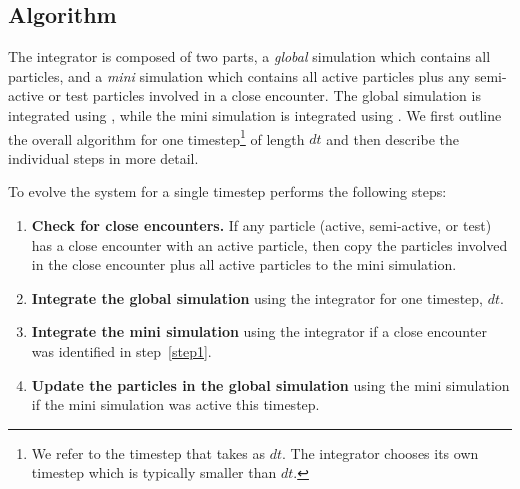 
\subsection{Algorithm}
\label{sec:Alg}
The \hermes integrator is composed of two parts, a \textit{global} simulation which contains all particles, and a \textit{mini} simulation which contains all active particles plus any semi-active or test particles involved in a close encounter.
The global simulation is integrated using \whfast, while the mini simulation is integrated using \ias. 
We first outline the overall algorithm for one timestep\footnote{We refer to the timestep that \whfast takes as $dt$. The \ias integrator chooses its own timestep which is typically smaller than $dt$.}  of length $dt$ and then describe the individual steps in more detail.

To evolve the system for a single timestep \hermes performs the following steps:
\begin{enumerate}
\item \label{step1} \textbf{Check for close encounters.} If any particle (active, semi-active, or test) has a close encounter with an active particle, then copy the particles involved in the close encounter plus all active particles to the mini simulation. 
\item \textbf{Integrate the global simulation} using the \whfast integrator for one timestep, $dt$.
\item \textbf{Integrate the mini simulation} using the \ias integrator if a close encounter was identified in step~\ref{step1}.
\item \textbf{Update the particles in the global simulation} using the mini simulation if the mini simulation was active this timestep.
\end{enumerate}


